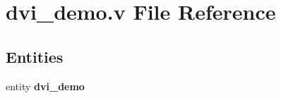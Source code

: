 \section{dvi\-\_\-demo.\-v File Reference}
\label{dvi__demo_8v}
\subsection*{Entities}
\begin{DoxyCompactItemize}
\item 
entity {\bf dvi\-\_\-demo}
\end{DoxyCompactItemize}
